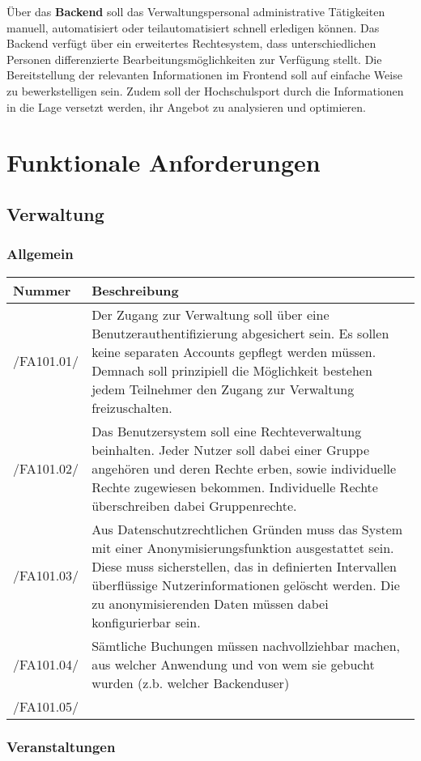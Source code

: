 \documentclass[a4paper,11pt]{article}
\newcommand\addrow[2]{#1 &#2\\ }
\newcommand\addheading[2]{#1 &#2\\ \hline}
\newcommand\tabularhead{\begin{tabular}{lp{13cm}}
\hline
}
\newenvironment{usecase}{\tabularhead}
{\hline\end{tabular}}
\begin{document}
Über das \textbf{Backend} soll das Verwaltungspersonal administrative Tätigkeiten manuell, automatisiert oder teilautomatisiert schnell erledigen können. Das Backend verfügt über ein erweitertes Rechtesystem, dass unterschiedlichen Personen differenzierte Bearbeitungsmöglichkeiten zur Verfügung stellt. Die Bereitstellung der relevanten Informationen im Frontend soll auf einfache Weise zu bewerkstelligen sein. Zudem soll der Hochschulsport durch die Informationen in die Lage versetzt werden, ihr Angebot zu analysieren und optimieren.

\section{Funktionale Anforderungen}
\subsection{Verwaltung}
\subsubsection{Allgemein}
\begin{usecase}
  \addheading{Nummer}{Beschreibung} 
  \addrow{/FA101.01/}{Der Zugang zur Verwaltung soll über eine Benutzerauthentifizierung abgesichert sein. Es sollen keine separaten Accounts gepflegt werden müssen. Demnach soll prinzipiell die Möglichkeit bestehen jedem Teilnehmer den Zugang zur Verwaltung freizuschalten.}
  \addrow{/FA101.02/}{Das Benutzersystem soll eine Rechteverwaltung beinhalten. Jeder Nutzer soll dabei einer Gruppe angehören und deren Rechte erben, sowie individuelle Rechte zugewiesen bekommen. Individuelle Rechte überschreiben dabei Gruppenrechte.}
  \addrow{/FA101.03/}{Aus Datenschutzrechtlichen Gründen muss das System mit einer Anonymisierungsfunktion ausgestattet sein. Diese muss sicherstellen, das in definierten Intervallen überflüssige Nutzerinformationen gelöscht werden. Die zu anonymisierenden Daten müssen dabei konfigurierbar sein.}
  \addrow{/FA101.04/}{Sämtliche Buchungen müssen nachvollziehbar machen, aus welcher Anwendung und von wem sie gebucht wurden (z.b. welcher Backenduser)}
  \addrow{/FA101.05/}{}
\end{usecase}

\subsubsection{Veranstaltungen}
\end{document}
